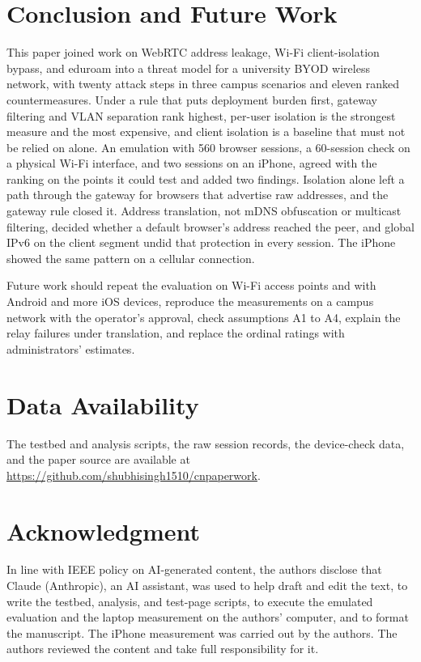 \documentclass[conference]{IEEEtran}
\begin{document}
\section{Conclusion and Future Work}
\label{sec:conclusion}
This paper joined work on WebRTC address leakage, Wi-Fi client-isolation bypass, and eduroam into a threat model for a university BYOD wireless network, with twenty attack steps in three campus scenarios and eleven ranked countermeasures. Under a rule that puts deployment burden first, gateway filtering and VLAN separation rank highest, per-user isolation is the strongest measure and the most expensive, and client isolation is a baseline that must not be relied on alone. An emulation with 560 browser sessions, a 60-session check on a physical Wi-Fi interface, and two sessions on an iPhone, agreed with the ranking on the points it could test and added two findings. Isolation alone left a path through the gateway for browsers that advertise raw addresses, and the gateway rule closed it. Address translation, not mDNS obfuscation or multicast filtering, decided whether a default browser's address reached the peer, and global IPv6 on the client segment undid that protection in every session. The iPhone showed the same pattern on a cellular connection.

Future work should repeat the evaluation on Wi-Fi access points and with Android and more iOS devices, reproduce the measurements on a campus network with the operator's approval, check assumptions A1 to A4, explain the relay failures under translation, and replace the ordinal ratings with administrators' estimates.

\section*{Data Availability}
The testbed and analysis scripts, the raw session records, the device-check data, and the paper source are available at \url{https://github.com/shubhisingh1510/cnpaperwork}.

\section*{Acknowledgment}
In line with IEEE policy on AI-generated content, the authors disclose that Claude (Anthropic), an AI assistant, was used to help draft and edit the text, to write the testbed, analysis, and test-page scripts, to execute the emulated evaluation and the laptop measurement on the authors' computer, and to format the manuscript. The iPhone measurement was carried out by the authors. The authors reviewed the content and take full responsibility for it.

\balance


\end{document}
